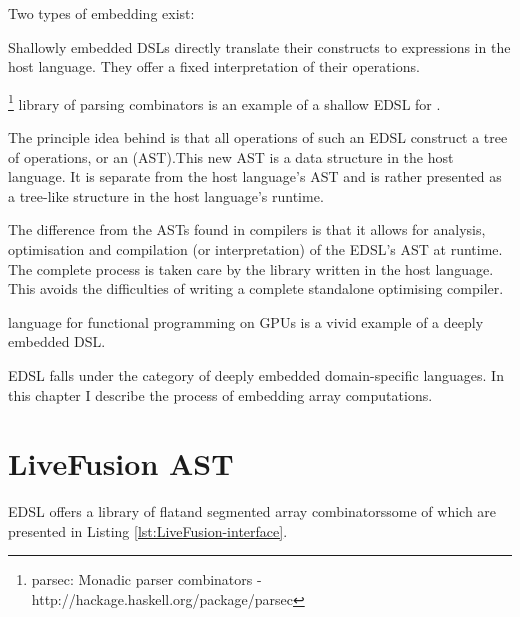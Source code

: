 \documentclass[preamble.tex]{subfiles}
\begin{document}
Two types of embedding exist:
\begin{description}
\item {}

Shallowly embedded DSLs directly translate their constructs to expressions in the host language. They offer a fixed interpretation of their operations.

\footnote{parsec: Monadic parser combinators - http://hackage.haskell.org/package/parsec} library of parsing combinators is an example of a shallow EDSL for \Haskell.

\item {} 

The principle idea behind  is that all operations of such an EDSL construct a tree of operations, or an  (AST).\iast This new AST is a data structure in the host language. It is separate from the host language's AST and is rather presented as a tree-like structure in the host language's runtime.

The difference from the ASTs found in compilers is that it allows for analysis, optimisation and compilation (or interpretation) of the EDSL's AST at runtime. The complete process is taken care by the library written in the host language. This avoids the difficulties of writing a complete standalone optimising compiler.

 language for functional programming on GPUs \cite{CKL+11} is a vivid example of a deeply embedded DSL.
\end{description}

\LiveFusion EDSL falls under the category of deeply embedded domain-specific languages. In this chapter I describe the process of embedding array computations.


\clearpage

\section{LiveFusion AST}

\LiveFusion EDSL offers a library of flat\iflatcomb and segmented array combinators\isegcomb some of which are presented in Listing \ref{lst:LiveFusion-interface}.
\end{document}
